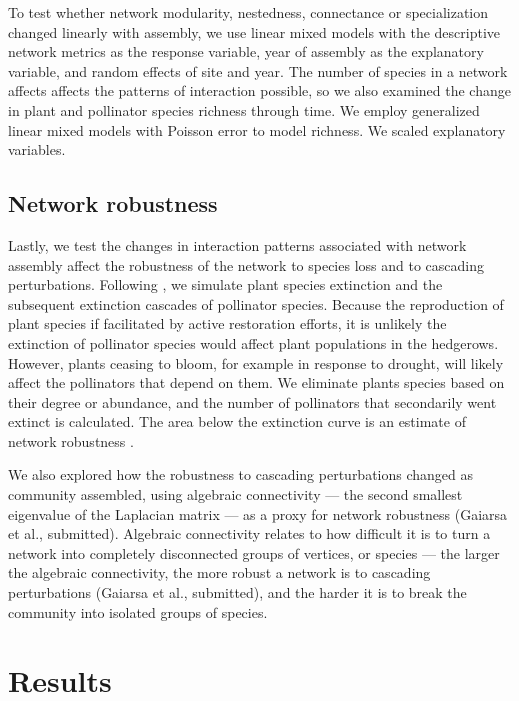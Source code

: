 \documentclass[12pt]{article}
\begin{document}
To test whether network modularity, nestedness, connectance or
specialization changed linearly with assembly, we use linear mixed
models with the descriptive network metrics as the response variable,
year of assembly as the explanatory variable, and random effects of
site and year. The number of species in a network affects affects the
patterns of interaction possible, so we also examined the change in
plant and pollinator species richness through time. We employ
generalized linear mixed models with Poisson error to model
richness. We scaled explanatory variables.


\subsection*{Network robustness}
Lastly, we test the changes in interaction patterns associated with
network assembly affect the robustness of the network to species loss
and to cascading perturbations. Following \cite{Memmott2004}, we
simulate plant species extinction and the subsequent extinction
cascades of pollinator species. Because the reproduction of plant
species if facilitated by active restoration efforts, it is unlikely
the extinction of pollinator species would affect plant populations in
the hedgerows. However, plants ceasing to bloom, for example in
response to drought, will likely affect the pollinators that depend on
them. We eliminate plants species based on their degree or abundance,
and the number of pollinators that secondarily went extinct is
calculated. The area below the extinction curve is an estimate of
network robustness \citep{bipartite}.

We also explored how the robustness to cascading perturbations changed
as community assembled, using algebraic connectivity --- the second
smallest eigenvalue of the Laplacian matrix
\citep{fiedler1973algebraic} --- as a proxy for network robustness
(Gaiarsa et al., submitted). Algebraic connectivity relates to how
difficult it is to turn a network into completely disconnected groups
of vertices, or species \citep{costa2007characterization} --- the
larger the algebraic connectivity, the more robust a network is to
cascading perturbations (Gaiarsa et al., submitted), and the harder it
is to break the community into isolated groups of species.

\section*{Results}
\label{sec:results}
\end{document}
